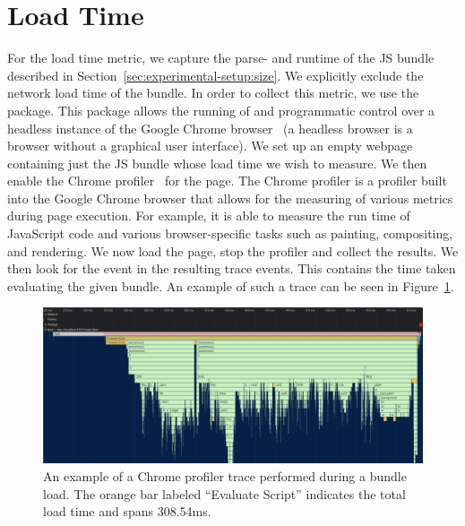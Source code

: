 \section{Load Time}\label{sec:experimental-setup:load-time}
For the load time metric, we capture the parse- and runtime of the JS bundle described in Section~\ref{sec:experimental-setup:size}. We explicitly exclude the network load time of the bundle. In order to collect this metric, we use the  package. This package allows the running of and programmatic control over a headless instance of the Google Chrome browser~ (a headless browser is a browser without a graphical user interface). We set up an empty webpage containing just the JS bundle whose load time we wish to measure. We then enable the Chrome profiler~ for the page. The Chrome profiler is a profiler built into the Google Chrome browser that allows for the measuring of various metrics during page execution. For example, it is able to measure the run time of JavaScript code and various browser-specific tasks such as painting, compositing, and rendering. We now load the page, stop the profiler and collect the results. We then look for the  event in the resulting trace events. This contains the time taken evaluating the given bundle. An example of such a trace can be seen in Figure~\ref{fig:experimental-setup:load-time}.

\begin{figure}[h]
  \includegraphics[width=\columnwidth]{figures/experimental-setup/load-time.png}
  \caption{An example of a Chrome profiler trace performed during a bundle load. The orange bar labeled ``Evaluate Script'' indicates the total load time and spans 308.54ms.}
  \label{fig:experimental-setup:load-time}
  \centering
\end{figure}

